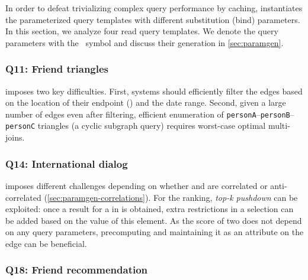 In order to defeat trivializing complex query performance by caching, \snbbi 
instantiates the parameterized query templates with different substitution (\aka bind) parameters.
In this section, we analyze four read query templates.
We denote the query parameters with the \param{}~symbol and discuss their generation in \autoref{sec:paramgen}.

\subsubsection{Q11: Friend triangles}

 imposes two key difficulties.
First, systems should efficiently filter the \tKnows edges based on the location of their endpoint \tPersons (\tCountry {}) and the date range.
Second, given a large number of \tKnows edges even after filtering,
efficient enumeration of \texttt{personA}--\texttt{personB}--\texttt{personC} triangles (a cyclic subgraph query)
requires worst-case optimal multi-joins.

\subsubsection{Q14: International dialog}

 imposes different challenges depending on whether
\tCountries {} and  are correlated or anti-correlated
(\autoref{sec:paramgen-correlations}).
For the ranking, \emph{top-k pushdown} can be exploited:
once a result for a \tCity in  is obtained,
extra restrictions in a selection can be added based on the value of this element.
As the score of two \tPersons does not depend on any query parameters,
precomputing and maintaining it as an attribute on the \tKnows edge can be beneficial.

\subsubsection{Q18: Friend recommendation}

